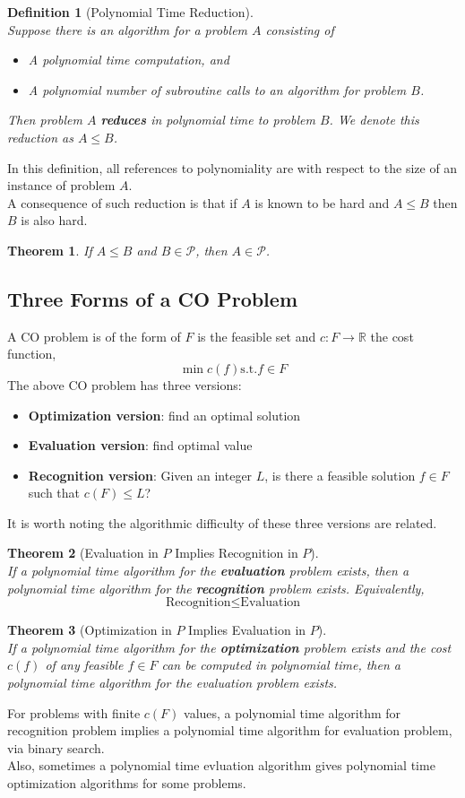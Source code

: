\documentclass[12pt]{article}
\newcommand{\st}{\mathrm{s.t.}}
\newtheorem{definition}{Definition}[section]
\newtheorem{theorem}{Theorem}[section]
\theoremstyle{definition}
\begin{document}
\begin{definition}[Polynomial Time Reduction]
\hfill\\\normalfont Suppose there is an algorithm for a problem $A$ consisting of
\begin{itemize}
  \item A polynomial time computation, and
  \item A polynomial number of subroutine calls to an algorithm for problem $B$.
\end{itemize}
Then problem $A$ \textbf{reduces} in polynomial time to problem $B$. We denote this reduction as $A\leq B$.
\end{definition}
In this definition, all references to polynomiality are with respect to the size of an instance of problem $A$.\\
A consequence of such reduction is that if $A$ is known to be hard and $A\leq B$ then $B$ is also hard.
\begin{theorem}\normalfont If $A\leq B$ and $B\in\mathcal{P}$, then $A\in\mathcal{P}$.
\end{theorem}
\subsection{Three Forms of a CO Problem}
A CO problem is of the form of $F$ is the feasible set and $c:F\to\mathbb{R}$ the cost function, 
\[
\min c(f) \st f\in F
\]
The above CO problem has three versions:
\begin{itemize}
  \item \textbf{Optimization version}: find an optimal solution
  \item \textbf{Evaluation version}: find optimal value
  \item \textbf{Recognition version}: Given an integer $L$, is there a feasible solution $f\in F$ such that $c(F)\leq L$?
\end{itemize}
It is worth noting the algorithmic difficulty of these three versions are related.
\begin{theorem}[Evaluation in {$P$} Implies Recognition in {$P$}]
\hfill\\\normalfont If a polynomial time algorithm for the \textbf{evaluation} problem exists, then a polynomial time algorithm for the \textbf{recognition} problem exists. Equivalently,
\[
\text{Recognition}\leq \text{Evaluation}
\]
\end{theorem}
\begin{theorem}[Optimization in {$P$} Implies Evaluation in {$P$}]
\hfill\\\normalfont If a polynomial time algorithm for the \textbf{optimization} problem exists and the cost $c(f)$ of any feasible $f\in F$ can be computed in polynomial time, then a polynomial time algorithm for the evaluation problem exists.
\end{theorem}
For problems with finite $c(F)$ values, a polynomial time algorithm for recognition problem implies a polynomial time algorithm for evaluation problem, via binary search.\\
Also, sometimes a polynomial time evluation algorithm gives polynomial time optimization algorithms for some problems.
\end{document}
